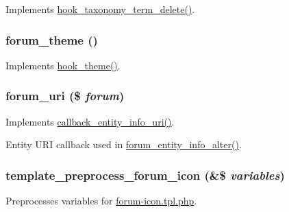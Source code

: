 \label{forum_8module_a4fa90e2df492cc84662faa0f2742fa71}
Implements \hyperlink{group__hooks_gab55fa1f290f3d43ea59795123154cf32}{hook\_\-taxonomy\_\-term\_\-delete()}. \hypertarget{forum_8module_afac3e683694ac93e71a52580010b9d76}{
\subsubsection[{forum\_\-theme}]{\setlength{\rightskip}{0pt plus 5cm}forum\_\-theme ()}}
\label{forum_8module_afac3e683694ac93e71a52580010b9d76}
Implements \hyperlink{group__hooks_ga013ccb45c7aaab1c16cf9691428c910d}{hook\_\-theme()}. \hypertarget{forum_8module_a2bccb8f9b59d9a2d8dab64cd67c012a0}{
\subsubsection[{forum\_\-uri}]{\setlength{\rightskip}{0pt plus 5cm}forum\_\-uri (\$ {\em forum})}}
\label{forum_8module_a2bccb8f9b59d9a2d8dab64cd67c012a0}
Implements \hyperlink{group__callbacks_ga42bf4e69ee32b2bc99d0d774d4917254}{callback\_\-entity\_\-info\_\-uri()}.

Entity URI callback used in \hyperlink{forum_8module_a30c4ed7429841ff6f564f958a875e2e8}{forum\_\-entity\_\-info\_\-alter()}. \hypertarget{forum_8module_a5678a953a46d6c5f19c1322178d73bf1}{
\subsubsection[{template\_\-preprocess\_\-forum\_\-icon}]{\setlength{\rightskip}{0pt plus 5cm}template\_\-preprocess\_\-forum\_\-icon (\&\$ {\em variables})}}
\label{forum_8module_a5678a953a46d6c5f19c1322178d73bf1}
Preprocesses variables for \hyperlink{forum-icon_8tpl_8php}{forum-\/icon.tpl.php}.


